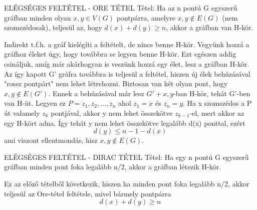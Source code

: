\begin{tetel}{
ELÉGSÉGES FELTÉTEL - ORE TÉTEL Tétel}: Ha az n pontú G egyszerű gráfban minden olyan $x,y\in V(G)$ pontpárra, amelyre ${x,y}\not\in E(G)$ (nem szomszédosak), teljesül az, hogy $d(x) + d(y) \geq n$, akkor a gráfban van H-kör.
\end{tetel}
\begin{leftbar}
Indirekt t.f.h. a gráf kielégíti a feltételt, de nincs benne H-kör. Vegyünk hozzá a gráfhoz éleket úgy, hogy továbbra se legyen benne H-kör. Ezt egészen addig csináljuk, amíg már akárhogyan is veszünk hozzá egy élet, lesz a gráfban H-kör. Az így kapott G' gráfra továbbra is teljesül a feltétel, hiszen új élek behúzásával "rossz pontpárt" nem lehet létrehozni. Biztosan van két olyan pont, hogy ${x,y} \not \in E(G')$. Ennek a behúzásával már lesz $G' + {x,y}$-ban H-kör, tehát G'-ben van H-út. Legyen ez $P = {z_1, z_2,...,z_n}$ ahol $z_1 = x$ és $z_n = y$.
Ha x szomszédos a P út valamely $z_k$ pontjával, akkor y nem lehet összekötve $z_{k-1}$-el, mert akkor az egy H-kört adna. Így tehát y nem lehet összekötve legalább d(x) ponttal, ezért
$$d(y) \leq n - 1 - d(x)$$
ami viszont ellentmondás, hisz ${x,y} \not\in E(G)$.
\end{leftbar}
\begin{tetel}{
ELÉGSÉGES FELTÉTEL - DIRAC TÉTEL Tétel}: Ha egy n pontú G egyszerű gráfban minden pont foka legalább n/2, akkor a gráfban létezik H-kör.
\end{tetel}
\begin{leftbar}
Ez az előző tételből következik, hiszen ha minden pont foka legalább n/2, akkor teljesül az Ore-tétel feltétele, mivel bármely pontpárra $$d(x) + d(y) \geq n$$
\end{leftbar}
